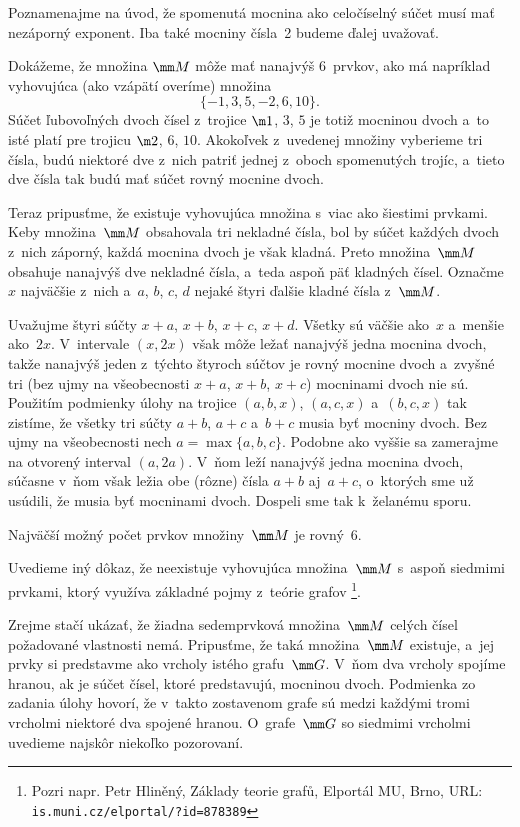 {%
Poznamenajme na úvod, že spomenutá mocnina ako
celočíselný súčet musí mať nezáporný exponent. Iba také
mocniny čísla~2 budeme ďalej uvažovať.

Dokážeme, že množina $\mm M$ môže mať nanajvýš 6~prvkov, ako má
napríklad vyhovujúca (ako vzápätí overíme) množina
$$
\{-1, 3, 5, -2, 6, 10\}.
$$
Súčet ľubovoľných dvoch čísel z~trojice $\m1$, $3$, $5$ je totiž
mocninou dvoch a~to isté platí pre trojicu $\m2$, $6$, $10$. Akokoľvek
z~uvedenej množiny vyberieme tri čísla, budú niektoré dve z~nich patriť
jednej z~oboch spomenutých trojíc, a~tieto dve čísla
tak budú mať súčet rovný mocnine dvoch.

Teraz pripusťme, že existuje vyhovujúca množina s~viac ako šiestimi prvkami.
Keby množina~$\mm M$ obsahovala tri nekladné čísla, bol by súčet každých
dvoch z~nich záporný, každá mocnina dvoch je však kladná.
Preto množina~$\mm M$ obsahuje nanajvýš dve nekladné čísla, a~teda aspoň päť
kladných čísel. Označme $x$ najväčšie z~nich a~$a$, $b$,
$c$, $d$ nejaké štyri ďalšie kladné čísla z~$\mm M$.

Uvažujme štyri súčty $x+a$, $x+b$, $x+c$, $x+d$. Všetky sú väčšie ako~$x$
a~menšie ako~$2x$. V~intervale $(x,2x)$ však môže ležať nanajvýš jedna
mocnina dvoch, takže nanajvýš jeden z~týchto štyroch súčtov je rovný mocnine
dvoch a~zvyšné tri (bez ujmy na všeobecnosti $x+a$, $x+b$, $x+c$)
mocninami dvoch nie sú.
Použitím podmienky úlohy na trojice $(a,b,x)$, $(a,c,x)$ a~$(b,c,x)$ tak
zistíme, že všetky tri súčty $a+b$, $a+c$ a~$b+c$ musia byť mocniny dvoch.
Bez ujmy na všeobecnosti nech $a=\max\{a,b,c\}$. Podobne ako vyššie
sa zamerajme na otvorený interval $(a,2a)$. V~ňom leží nanajvýš jedna
mocnina dvoch, súčasne v~ňom však ležia obe (rôzne) čísla $a+b$ aj~$a+c$,
o~ktorých sme už usúdili, že musia byť mocninami dvoch.
Dospeli sme tak k~želanému sporu.

\odpoved
Najväčší možný počet prvkov množiny~$\mm M$ je rovný~6.

\ineres
Uvedieme iný dôkaz, že neexistuje vyhovujúca množina~$\mm M$ s~aspoň siedmimi prvkami,
ktorý využíva základné pojmy z~teórie grafov
\footnote{Pozri napr. Petr Hliněný, Základy teorie grafů, Elportál MU, Brno,\newline
URL: {\tt is.muni.cz/elportal/?id=878389}}.

Zrejme stačí ukázať, že žiadna sedemprvková množina~$\mm M$
celých čísel požadované vlastnosti nemá.
Pripusťme,
že taká množina~$\mm M$ existuje, a~jej prvky si predstavme
ako vrcholy istého grafu~$\mm G$. V~ňom dva vrcholy spojíme hranou,
ak je súčet čísel, ktoré predstavujú, mocninou dvoch.
Podmienka zo zadania úlohy hovorí, že v~takto zostavenom grafe sú
medzi každými tromi vrcholmi niektoré dva spojené hranou.
O~grafe~$\mm G$ so siedmimi vrcholmi uvedieme najskôr niekoľko
pozorovaní.

}
